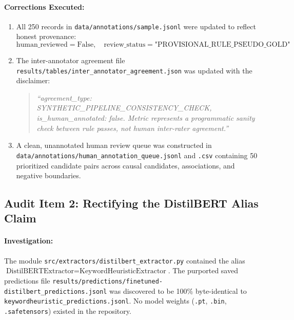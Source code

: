 \documentclass[11pt,a4paper]{article}
\begin{document}
\paragraph{Corrections Executed:}
\begin{enumerate}[leftmargin=1.5em]
    \item All 250 records in \texttt{data/annotations/sample.jsonl} were updated to reflect honest provenance:
    \begin{equation}
        \text{human\_reviewed} = \text{False}, \quad \text{review\_status} = \text{"PROVISIONAL\_RULE\_PSEUDO\_GOLD"}
    \end{equation}
    \item The inter-annotator agreement file \texttt{results/tables/inter\_annotator\_agreement.json} was updated with the disclaimer:
    \begin{quote}
        \small\textit{``agreement\_type: SYNTHETIC\_PIPELINE\_CONSISTENCY\_CHECK, is\_human\_annotated: false. Metric represents a programmatic sanity check between rule passes, not human inter-rater agreement.''}
    \end{quote}
    \item A clean, unannotated human review queue was constructed in \texttt{data/annotations/human\_annotation\_queue.jsonl} and \texttt{.csv} containing 50 prioritized candidate pairs across causal candidates, associations, and negative boundaries.
\end{enumerate}

\subsection{Audit Item 2: Rectifying the DistilBERT Alias Claim}
\paragraph{Investigation:} The module \texttt{src/extractors/distilbert\_extractor.py} contained the alias $\text{DistilBERTExtractor} = \text{KeywordHeuristicExtractor}$. The purported saved predictions file \texttt{results/predictions/finetuned-distilbert\_predictions.jsonl} was discovered to be 100\% byte-identical to \texttt{keywordheuristic\_predictions.jsonl}. No model weights (\texttt{.pt}, \texttt{.bin}, \texttt{.safetensors}) existed in the repository.
\end{document}

